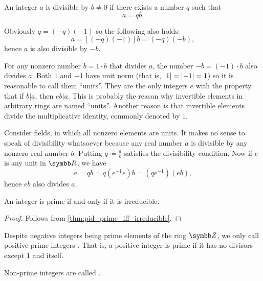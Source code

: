 \begin{remark}\label{remark:units_in_rings_etymology}
  An integer \( a \) is divisible by \( b \neq 0 \) if there exists a number \( q \) such that
  \begin{equation*}
    a = qb.
  \end{equation*}

  Obviously \( q = (-q)(-1) \) so the following also holds:
  \begin{equation*}
    a = [(-q)(-1)]b = (-q)(-b),
  \end{equation*}
  hence \( a \) is also divisible by \( -b \).

  For any nonzero number \( b = 1 \cdot b \) that divides \( a \), the number \( -b = (-1) \cdot b \) also divides \( a \). Both \( 1 \) and \( -1 \) have unit norm (that is, \( \left\vert 1 \right\vert = \left\vert -1 \right\vert = 1 \)) so it is reasonable to call them \enquote{units}. They are the only integers \( e \) with the property that if \( b | a \), then \( eb | a \). This is probably the reason why invertible elements in arbitrary rings are named \enquote{units}. Another reason is that invertible elements divide the multiplicative identity, commonly denoted by \( 1 \).

  Consider fields, in which all nonzero elements are units. It makes no sense to speak of divisibility whatsoever because any real number \( a \) is divisible by any nonzero real number \( b \). Putting \( q \coloneqq \frac a b \) satisfies the divisibility condition. Now if \( e \) is any unit in \( \R \), we have
  \begin{equation*}
    a = qb = q(e^{-1} e) b = (qe^{-1}) (eb),
  \end{equation*}
  hence \( eb \) also divides \( a \).
\end{remark}

\begin{lemma}\label{thm:euclids_lemma}
  An integer is prime if and only if it is irreducible.
\end{lemma}
\begin{proof}
  Follows from \cref{thm:pid_prime_iff_irreducible}.
\end{proof}

\begin{definition}\label{def:prime_number}
  Despite negative integers being prime elements of the ring \( \Z \), we only call positive prime integers . That is, a positive integer is prime if it has no divisors except \( 1 \) and itself.

  Non-prime integers are called .
\end{definition}

